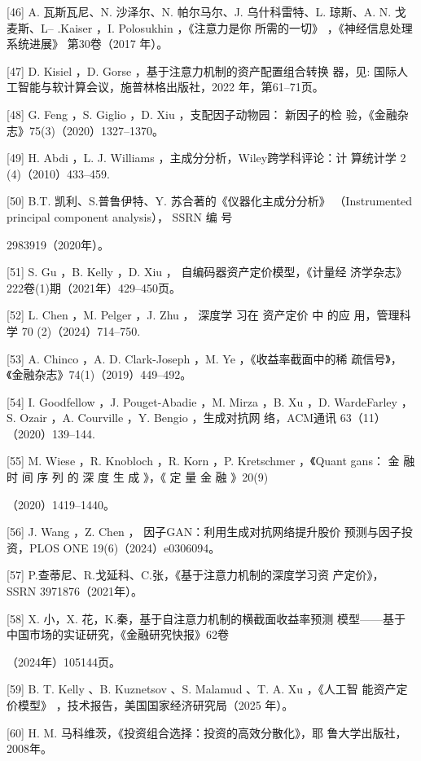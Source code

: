 \documentclass[UTF8]{ctexart}
\begin{document}
\begin{enumerate}
  {[}46{]} A. 瓦斯瓦尼、N. 沙泽尔、N. 帕尔马尔、J. 乌什科雷特、L.
  琼斯、A. N. 戈麦斯、L-- .Kaiser ，I. Polosukhin ，《注意力是你
  所需的一切》 ，《神经信息处理系统进展》 第30卷（2017 年）。

  {[}47{]} D. Kisiel ，D. Gorse ，基于注意力机制的资产配置组合转换
  器，见: 国际人工智能与软计算会议，施普林格出版社，2022
  年，第61--71页。

  {[}48{]} G. Feng ，S. Giglio ，D. Xiu ，支配因子动物园： 新因子的检
  验，《金融杂志》75(3)（2020）1327--1370。

  {[}49{]} H. Abdi ，L. J. Williams ，主成分分析，Wiley跨学科评论：计
  算统计学 2 (4)（2010）433--459.

  {[}50{]} B.T. 凯利、S.普鲁伊特、Y. 苏合著的《仪器化主成分分析》
  （Instrumented principal component analysis）， SSRN 编 号

  2983919（2020年）。

  {[}51{]} S. Gu ，B. Kelly ，D. Xiu ， 自编码器资产定价模型，《计量经
  济学杂志》222卷(1)期（2021年）429--450页。

  {[}52{]} L. Chen ，M. Pelger ，J. Zhu ， 深度学 习在 资产定价 中 的应
  用，管理科学 70 (2)（2024）714--750.

  {[}53{]} A. Chinco ，A. D. Clark-Joseph ，M. Ye ，《收益率截面中的稀
  疏信号》，《金融杂志》74(1)（2019）449--492。

  {[}54{]} I. Goodfellow ，J. Pouget-Abadie ，M. Mirza ，B. Xu ，D.
  WardeFarley ，S. Ozair ，A. Courville ，Y. Bengio ，生成对抗网
  络，ACM通讯 63（11）（2020）139--144.

  {[}55{]} M. Wiese ，R. Knobloch ，R. Korn ，P. Kretschmer ，《Quant
  gans： 金 融 时 间 序 列 的 深 度 生 成 》，《 定 量 金 融 》20(9)

  （2020）1419--1440。

  {[}56{]} J. Wang ，Z. Chen ， 因子GAN：利用生成对抗网络提升股价
  预测与因子投资，PLOS ONE 19(6)（2024）e0306094。

  {[}57{]} P.查蒂尼、R.戈延科、C.张，《基于注意力机制的深度学习资
  产定价》， SSRN 3971876（2021年）。

  {[}58{]} X. 小，X. 花，K.秦，基于自注意力机制的横截面收益率预测
  模型------基于中国市场的实证研究，《金融研究快报》62卷

  （2024年）105144页。

  {[}59{]} B. T. Kelly 、B. Kuznetsov 、S. Malamud 、T. A. Xu ，《人工智
  能资产定价模型》 ，技术报告，美国国家经济研究局（2025 年）。

  {[}60{]} H. M. 马科维茨，《投资组合选择：投资的高效分散化》，耶
  鲁大学出版社，2008年。


\end{enumerate}
\end{document}
